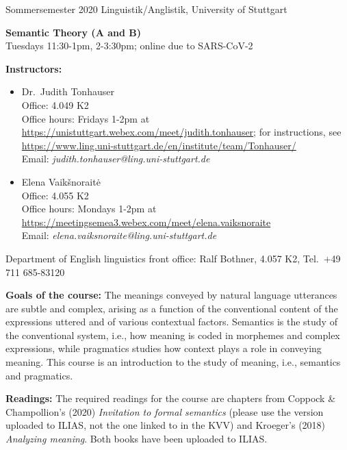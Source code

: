 \documentclass[11pt,fleqn,a4]{article}
\newcommand{\6}{\mbox{$[\hspace*{-.6mm}[$}}
\newcommand{\9}{\mbox{$]\hspace*{-.6mm}]$}}
\begin{document}
Sommersemester 2020 \hfill Linguistik/Anglistik, University of Stuttgart

\begin{center}

{\bf \large Semantic Theory (A and B)}
\\ Tuesdays 11:30-1pm, 2-3:30pm; online due to SARS-CoV-2

\end{center}

\vspace*{-.3cm}

{\bf Instructors:} 


\begin{itemize}

\item Dr.\ Judith Tonhauser 
\\ Office: 4.049 K2 
\\ Office hours: Fridays 1-2pm at \url{https://unistuttgart.webex.com/meet/judith.tonhauser}; for instructions, see \url{https://www.ling.uni-stuttgart.de/en/institute/team/Tonhauser/} 
\\ Email: {\em judith.tonhauser@ling.uni-stuttgart.de} 

\item Elena Vaik\v snorait\.{e}
\\ Office:  4.055 K2
\\ Office hours: Mondays 1-2pm at \url{https://meetingsemea3.webex.com/meet/elena.vaiksnoraite}
\\ Email: {\em elena.vaiksnoraite@ling.uni-stuttgart.de }

\end{itemize}

\medskip

Department of English linguistics front office: Ralf Bothner, 4.057 K2, Tel.\ +49 711 685-83120

{\bf Goals of the course:} The meanings conveyed by natural language utterances are subtle and complex, arising as a function of the conventional content of the expressions uttered and of various contextual factors. Semantics is the study of the conventional system, i.e., how meaning is coded in morphemes and complex expressions, while pragmatics studies how context plays a role in conveying meaning. This course is an introduction to the study of meaning, i.e., semantics and pragmatics. 

{\bf Readings:} The required readings for the course are chapters from Coppock \& Champollion's (2020) {\em Invitation to formal semantics} (please use the version uploaded to ILIAS, not the one linked to in the KVV) and Kroeger's  (2018) {\em Analyzing meaning}. Both books have been uploaded to ILIAS. \nocite{coppock-champollion,kroeger2018}
\end{document}
